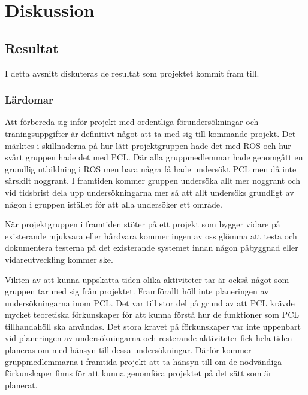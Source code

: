 \chapter{Diskussion}
\label{cha:discussion}

\section{Resultat}
\label{sec:discussion-results}


I detta avsnitt diskuteras de resultat som projektet kommit fram till.

\subsection{Lärdomar}

Att förbereda sig inför projekt med ordentliga förundersökningar och träningsuppgifter är definitivt något att ta med sig till kommande projekt. Det märktes i skillnaderna på hur lätt projektgruppen hade det med ROS och hur svårt gruppen hade det med PCL. Där alla gruppmedlemmar hade genomgått en grundlig utbildning i ROS men bara några få hade undersökt PCL men då inte särskilt noggrant. I framtiden kommer gruppen undersöka allt mer noggrant och vid tidsbrist dela upp undersökningarna mer så att allt undersöks grundligt av någon i gruppen istället för att alla undersöker ett område.

När projektgruppen i framtiden stöter på ett projekt som bygger vidare på existerande mjukvara eller hårdvara kommer ingen av oss glömma att testa och dokumentera testerna på det existerande systemet innan någon påbyggnad eller vidareutveckling kommer ske.

Vikten av att kunna uppskatta tiden olika aktiviteter tar är också något som gruppen tar med sig från projektet. Framförallt höll inte planeringen av undersökningarna inom PCL. Det var till stor del på grund av att PCL krävde mycket teoretiska förkunskaper för att kunna förstå hur de funktioner som PCL tillhandahöll ska användas. Det stora kravet på förkunskaper var inte uppenbart vid planeringen av undersökningarna och resterande aktiviteter fick hela tiden planeras om med hänsyn till dessa undersökningar. Därför kommer gruppmedlemmarna i framtida projekt att ta hänsyn till om de nödvändiga förkunskaper finns för att kunna genomföra projektet på det sätt som är planerat.

